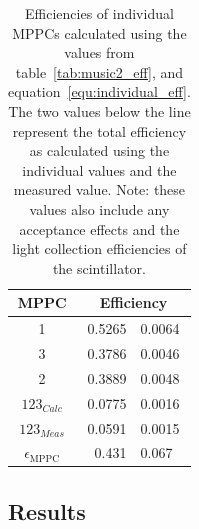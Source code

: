 \begin{table}
  \lineup
  \begin{center}
    \begin{tabular}{c|r@{~\(\pm\)~}l}
      MPPC  &  \multicolumn{2}{c}{Efficiency} \\
      \hline
      1  &  0.5265 & 0.0064  \\
      3  &  0.3786 & 0.0046  \\
      2  &  0.3889 & 0.0048  \\
      \hline
      \( 123_{Calc} \)  &  0.0775  &  0.0016  \\
      \( 123_{Meas} \)  &  0.0591  &  0.0015  \\
      \hline 
      \( \epsilon_{\text{MPPC}} \)  &  0.431\0 & 0.067 \\
         
    \end{tabular}
  \end{center}
  \caption{Efficiencies of individual MPPCs calculated using the values from table~\ref{tab:music2_eff}, and equation~\eqref{equ:individual_eff}. The two values below the line represent the total efficiency as calculated using the individual values and the measured value. Note: these values also include any acceptance effects and the light collection efficiencies of the scintillator.}
  \label{tab:calculated_individual_eff}
\end{table}


\subsection{Results} %
\label{sec:results}

